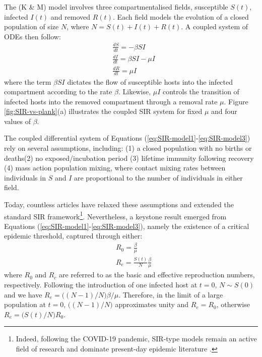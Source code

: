 The \cite{kermack-model} (K \& M) model involves three compartmentalised fields, 
susceptible $S(t)$, infected $I(t)$ and removed $R(t)$.
Each field models the evolution of a closed population of size $N$, where $N = S(t) + I(t) + R(t)$. 
A coupled system of ODEs then follow:
\begin{align}
\label{eq:SIR-model1}
    &\frac{dS}{dt} = -\beta SI \\
    &\frac{dI}{dt} = \beta SI - \mu I \\
    \label{eq:SIR-model3}
    &\frac{dR}{dt} = \mu I
\end{align}
where the term $\beta S I$ dictates the flow of susceptible hosts into the infected compartment according 
to the rate $\beta$. Likewise, $\mu I$ controls the transition of infected hosts into the removed compartment
through a removal rate $\mu$. Figure \ref{fig:SIR-vs-plank}(a) illustrates the coupled SIR system for 
fixed $\mu$ and four values of $\beta$.

The coupled differential system of Equations (\ref{eq:SIR-model1}-\ref{eq:SIR-model3}) rely on several assumptions, including:
(1) a closed population with no births or deaths(2) no exposed/incubation period (3) lifetime immunity following recovery
(4) mass action population mixing, where contact mixing rates between individuals in $S$ and $I$ are proportional 
to the number of individuals in either field.

Today, countless articles have relaxed these assumptions and extended the standard SIR framework\footnote{
Indeed, following the COVID-19 pandemic, SIR-type models remain an active field of research 
and dominate present-day epidemic literature \cite{atkeson2020using}.}.
Nevertheless, a keystone result emerged from Equations (\ref{eq:SIR-model1}-\ref{eq:SIR-model3}), namely 
the existence of a critical epidemic threshold, captured through either:
\begin{align}
    \label{eq:R0-SIR}
    & R_0 = \frac{\beta}{\mu}\\
    \label{eq:R0-effective}
    & R_e = \frac{S(t)}{N} \frac{\beta}{\mu}
\end{align}
where $R_0$ and $R_c$ are referred to as the basic and effective reproduction numbers, respectively.
Following the introduction of one infected host at $t=0$, $N\sim S(0)$ and 
we have $R_e=\big((N-1)/N\big) \beta / \mu$. Therefore, in the limit of a large population at $t=0$, 
$\big((N-1)/N\big)$ approximates unity and $R_e = R_0$, otherwise $R_e=\big(S(t)/N\big) R_0$.

